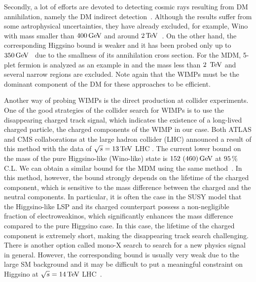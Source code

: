 \documentclass[12pt,twoside,book]{article}
\begin{document}
Secondly, a lot of efforts are devoted to detecting cosmic rays resulting from DM annihilation, namely the DM indirect detection~\cite{Fermi-LAT:2016uux, Ahnen:2016qkx, Abdallah:2016ygi, Gomez-Vargas:2013bea}.
Although the results suffer from some astrophysical uncertainties, they have already excluded, for example, Wino with mass smaller than $400\,{\rm GeV}$ and around $2\,{\rm TeV}$~\cite{Bhattacherjee:2014dya}.
On the other hand, the corresponding Higgsino bound is weaker and it has been probed only up to $350\,{\rm GeV}$~\cite{Krall:2017xij} due to the smallness of its annihilation cross section.
For the MDM, 5-plet fermion is analyzed as an example in \cite{Abdalla:2018mve} and the mass less than $2\,~{\rm TeV}$ and several narrow regions are excluded.
Note again that the WIMPs must be the dominant component of the DM for these approaches to be efficient.

Another way of probing WIMPs is the direct production at collider experiments.
One of the good strategies of the collider search for WIMPs is to use the disappearing charged track signal, which indicates the existence of a long-lived charged particle, the charged components of the WIMP in our case.
Both ATLAS and CMS collaborations at the large hadron collider (LHC) announced a result of this method with the data of $\sqrt{s} = 13\,{\rm TeV}$ LHC \cite{Aaboud:2017mpt, ATL-PHYS-PUB-2017-019, Sirunyan:2018ldc}.
The current lower bound on the mass of the pure Higgsino-like (Wino-like) state is $152~(460)\,{\rm GeV}$ at $95\,\%$ C.L.
We can obtain a similar bound for the MDM using the same method~\cite{Ostdiek:2015aga}.
In this method, however, the bound strongly depends on the lifetime of the charged component, which is sensitive to the mass difference between the charged and the neutral components.
In particular, it is often the case in the SUSY model that the Higgsino-like LSP and its charged counterpart possess a non-negligible fraction of electroweakinos, which significantly enhances the mass difference compared to the pure Higgsino case.
In this case, the lifetime of the charged component is extremely short, making the disappearing track search challenging.
There is another option called mono-X search to search for a new physics signal in general.
However, the corresponding bound is usually very weak due to the large SM background and it may be difficult to put a meaningful constraint on Higgsino at $\sqrt{s} = 14\,{\rm TeV}$ LHC~\cite{Baer:2014cua}.
\end{document}

